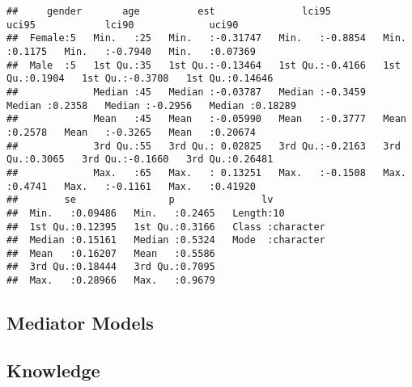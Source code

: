 \documentclass[
]{article}
\begin{document}
\begin{verbatim}
##     gender       age          est               lci95             uci95            lci90             uci90        
##  Female:5   Min.   :25   Min.   :-0.31747   Min.   :-0.8854   Min.   :0.1175   Min.   :-0.7940   Min.   :0.07369  
##  Male  :5   1st Qu.:35   1st Qu.:-0.13464   1st Qu.:-0.4166   1st Qu.:0.1904   1st Qu.:-0.3708   1st Qu.:0.14646  
##             Median :45   Median :-0.03787   Median :-0.3459   Median :0.2358   Median :-0.2956   Median :0.18289  
##             Mean   :45   Mean   :-0.05990   Mean   :-0.3777   Mean   :0.2578   Mean   :-0.3265   Mean   :0.20674  
##             3rd Qu.:55   3rd Qu.: 0.02825   3rd Qu.:-0.2163   3rd Qu.:0.3065   3rd Qu.:-0.1660   3rd Qu.:0.26481  
##             Max.   :65   Max.   : 0.13251   Max.   :-0.1508   Max.   :0.4741   Max.   :-0.1161   Max.   :0.41920  
##        se                p               lv           
##  Min.   :0.09486   Min.   :0.2465   Length:10         
##  1st Qu.:0.12395   1st Qu.:0.3166   Class :character  
##  Median :0.15161   Median :0.5324   Mode  :character  
##  Mean   :0.16207   Mean   :0.5586                     
##  3rd Qu.:0.18444   3rd Qu.:0.7095                     
##  Max.   :0.28966   Max.   :0.9679
\end{verbatim}

\hypertarget{mediator-models-5}{%
\subsection{Mediator Models}\label{mediator-models-5}}

\hypertarget{knowledge-5}{%
\subsection{Knowledge}\label{knowledge-5}}
\end{document}
